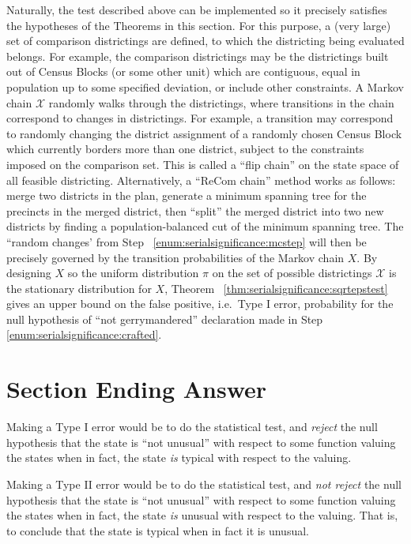 \documentclass[12pt]{article}
\begin{document}
\begin{example}
Naturally, the test described above can be implemented so it precisely
satisfies the hypotheses of the Theorems in this section.  For this
purpose, a (very large) set of comparison districtings are defined, to
which the districting being evaluated belongs.  For example, the
comparison districtings may be the districtings built out of Census
Blocks (or some other unit) which are contiguous, equal in population up
to some specified deviation, or include other constraints.  A Markov
chain \( \mathcal{X} \) randomly walks through the districtings, where
transitions in the chain correspond to changes in districtings.  For
example, a transition may correspond to randomly changing the district
assignment of a randomly chosen Census Block which currently borders
more than one district, subject to the constraints imposed on the
comparison set.  This is called a ``flip chain'' on the state space of
all feasible districting.  Alternatively, a ``ReCom chain'' method works
as follows:  merge two districts in the plan, generate a minimum
spanning tree for the precincts in the merged district, then ``split''
the merged district into two new districts by finding a
population-balanced cut of the minimum spanning tree.  The ``random
changes' from Step~%
\ref{enum:serialsignificance:mcstep} will then be precisely governed by
the transition probabilities of the Markov chain \( X \).  By designing \(
X \) so the uniform distribution \( \pi \) on the set of possible
districtings \( \mathcal{X} \) is the stationary distribution for \( X \),
Theorem~%
\ref{thm:serialsignificance:sqrtepstest} gives an upper bound on the
false positive, i.e.\ Type I error, probability for the null hypothesis
of ``not gerrymandered'' declaration made in Step~%
\ref{enum:serialsignificance:crafted}.

\section*{Section Ending Answer}

Making a Type I error would be to do the statistical test, and \emph{reject}
the null hypothesis that the state is ``not unusual'' with respect to
some function valuing the states when in fact, the state \emph{is}
typical with respect to the valuing.

Making a Type II error would be to do the statistical test, and \emph{not
reject} the null hypothesis that the state is ``not unusual'' with
respect to some function valuing the states when in fact, the state
\emph{is} unusual with respect to the valuing.  That is, to conclude
that the state is typical when in fact it is unusual.


\end{example}
\end{document}
